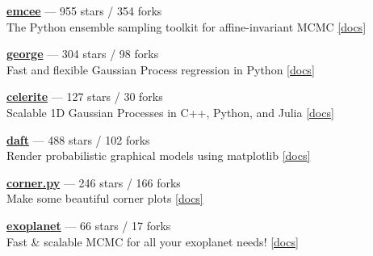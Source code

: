 \item \href{https://github.com/dfm/emcee}{{\bf emcee}} --- 955 stars / 354 forks \\
The Python ensemble sampling toolkit for affine-invariant MCMC \href{https://emcee.readthedocs.io}{[docs]}

\item \href{https://github.com/dfm/george}{{\bf george}} --- 304 stars / 98 forks \\
Fast and flexible Gaussian Process regression in Python \href{http://george.readthedocs.io}{[docs]}

\item \href{https://github.com/dfm/celerite}{{\bf celerite}} --- 127 stars / 30 forks \\
Scalable 1D Gaussian Processes in C++, Python, and Julia \href{http://celerite.rtfd.io}{[docs]}

\item \href{https://github.com/daft-dev/daft}{{\bf daft}} --- 488 stars / 102 forks \\
Render probabilistic graphical models using matplotlib \href{https://docs.daft-pgm.org}{[docs]}

\item \href{https://github.com/dfm/corner.py}{{\bf corner.py}} --- 246 stars / 166 forks \\
Make some beautiful corner plots \href{http://corner.readthedocs.io}{[docs]}

\item \href{https://github.com/dfm/exoplanet}{{\bf exoplanet}} --- 66 stars / 17 forks \\
Fast {\&} scalable MCMC for all your exoplanet needs!  \href{https://exoplanet.dfm.io}{[docs]}